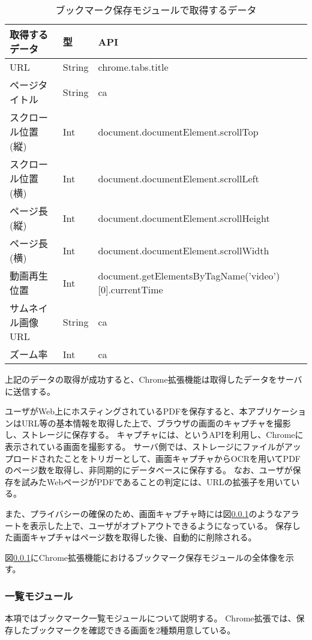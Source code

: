 \begin{table}[htbp]
  \label{tb:chrome-data-api}
  \caption{ブックマーク保存モジュールで取得するデータ}
  \begin{center}
    \begin{tabular}{|l|l|l|}
    \hline
    取得するデータ & 型 & API \\ \hline
    URL & String & chrome.tabs.title \\ \hline
    ページタイトル & String & ca \\ \hline
    スクロール位置(縦) & Int & document.documentElement.scrollTop \\ \hline
    スクロール位置(横) & Int & document.documentElement.scrollLeft \\ \hline
    ページ長(縦) & Int & document.documentElement.scrollHeight \\ \hline
    ページ長(横) & Int & document.documentElement.scrollWidth \\ \hline
    動画再生位置 & Int & document.getElementsByTagName('video')[0].currentTime \\ \hline
    サムネイル画像URL & String & ca \\ \hline
    ズーム率 & Int & ca \\ \hline
    \end{tabular}
  \end{center}
\end{table}

上記のデータの取得が成功すると、Chrome拡張機能は取得したデータをサーバに送信する。

ユーザがWeb上にホスティングされているPDFを保存すると、本アプリケーションはURL等の基本情報を取得した上で、ブラウザの画面のキャプチャを撮影し、ストレージに保存する。
キャプチャには、というAPIを利用し、Chromeに表示されている画面を撮影する。
サーバ側では、ストレージにファイルがアップロードされたことをトリガーとして、画面キャプチャからOCRを用いてPDFのページ数を取得し、非同期的にデータベースに保存する。
なお、ユーザが保存を試みたWebページがPDFであることの判定には、URLの拡張子を用いている。

また、プライバシーの確保のため、画面キャプチャ時には図\ref{}のようなアラートを表示した上で、ユーザがオプトアウトできるようになっている。
保存した画面キャプチャはページ数を取得した後、自動的に削除される。

図\ref{}にChrome拡張機能におけるブックマーク保存モジュールの全体像を示す。

\subsubsection{一覧モジュール}
本項ではブックマーク一覧モジュールについて説明する。
Chrome拡張では、保存したブックマークを確認できる画面を2種類用意している。

